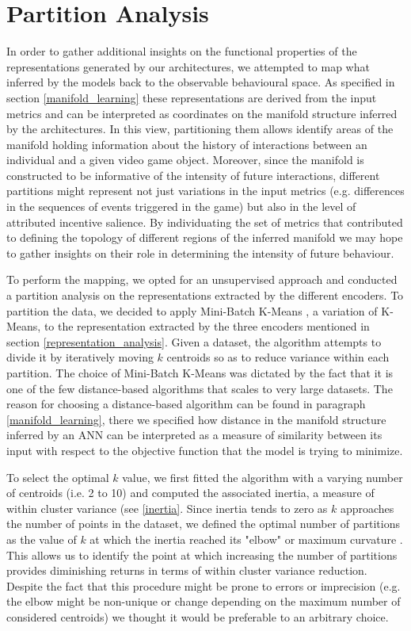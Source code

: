 \section{Partition Analysis}
\label{partition_analysese}
In order to gather additional insights on the functional properties of the representations generated by our architectures, we attempted to map what inferred by the models back to the observable behavioural space. As specified in section \ref{manifold_learning} these representations are derived from the input metrics and can be interpreted as coordinates on the manifold structure inferred by the architectures. In this view, partitioning them allows identify areas of the manifold holding information about the history of interactions between an individual and a given video game object. Moreover, since the manifold is constructed to be informative of the intensity of future interactions, different partitions might represent not just variations in the input metrics (e.g. differences in the sequences of events triggered in the game) but also in the level of attributed incentive salience. By individuating the set of metrics that contributed to defining the topology of different regions of the inferred manifold we may hope to gather insights on their role in determining the intensity of future behaviour. 

To perform the mapping, we opted for an unsupervised approach and conducted a partition analysis on the representations extracted by the different encoders. 
To partition the data, we decided to apply Mini-Batch K-Means \cite{sculley2010web}, a variation of K-Means, to the representation extracted by the three encoders mentioned in section \ref{representation_analysis}. Given a dataset, the algorithm attempts to divide it by iteratively moving $k$ centroids so as to reduce variance within each partition. The choice of Mini-Batch K-Means was dictated by the fact that it is one of the few distance-based algorithms that scales to very large datasets. The reason for choosing a distance-based algorithm can be found in paragraph \ref{manifold_learning}, there we specified how distance in the manifold structure inferred by an ANN can be interpreted as a measure of similarity between its input with respect to the objective function that the model is trying to minimize. 

To select the optimal $k$ value, we first fitted the algorithm with a varying number of centroids (i.e. 2 to 10) and computed the associated inertia, a measure of within cluster variance (see \ref{inertia}. Since inertia tends to zero as $k$ approaches the number of points in the dataset, we defined the optimal number of partitions as the value of $k$ at which the inertia reached its "elbow" or maximum curvature \cite{satopaa2011finding}. This allows us to identify the point at which increasing the number of partitions provides diminishing returns in terms of within cluster variance reduction. Despite the fact that this procedure might be prone to errors or imprecision (e.g. the elbow might be non-unique or change depending on the maximum number of considered centroids) we thought it would be preferable to an arbitrary choice. 

